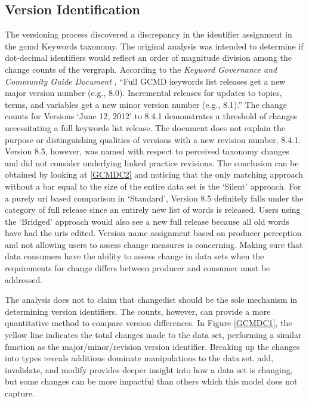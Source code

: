 \subsection{Version Identification}

The versioning process discovered a discrepancy in the identifier assignment in the \gls{gcmd} Keywords taxonomy.
The original analysis was intended to determine if dot-decimal identifiers would reflect an order of magnitude division among the change counts of the \gls{vergraph}.
According to the \textit{Keyword Governance and Community Guide Document} \cite{gcmd_gov}, ``Full GCMD keywords list releases get a new major version number (e.g., 8.0). Incremental releases for updates to topics, terms, and variables get a new minor version number (e.g., 8.1).”
The change counts for Versions `June 12, 2012' to 8.4.1 demonstrates a threshold of \glspl{change} necessitating a full keywords list release.
The document does not explain the purpose or distinguishing qualities of \glspl{version} with a new revision number, 8.4.1.
Version 8.5, however, was named with respect to perceived taxonomy changes and did not consider underlying \gls{linked} practice revisions.
The conclusion can be obtained by looking at \ref{GCMDC2} and noticing that the only matching approach without a bar equal to the size of the entire data set is the `Silent' approach.
For a purely \gls{uri} based comparison in `Standard', Version 8.5 definitely falls under the category of full release since an entirely new list of words is released.
Users using the `Bridged' approach would also see a new full release because all old words have had the \glspl{uri} edited.
Version name assignment based on producer perception and not allowing users to assess change measures is concerning.
Making sure that data consumers have the ability to assess change in data sets when the requirements for change differs between producer and consumer must be addressed.

The analysis does not to claim that \gls{changedist} should be the sole mechanism in determining version identifiers.
The counts, however, can provide a more quantitative method to compare version differences.
In Figure \ref{GCMDC1}, the yellow line indicates the total changes made to the data set, performing a similar function as the major/minor/revision version identifier.
Breaking up the changes into types reveals additions dominate manipulations to the data set.
\Gls{add}, \gls{invalidate}, and \gls{modify} provides deeper insight into how a data set is changing, but some \glspl{change} can be more impactful than others which this model does not capture.

